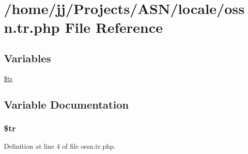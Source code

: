 \hypertarget{locale_2ossn_8tr_8php}{}\section{/home/jj/\+Projects/\+A\+S\+N/locale/ossn.tr.\+php File Reference}
\label{locale_2ossn_8tr_8php}
\subsection*{Variables}
\begin{DoxyCompactItemize}
\item 
\hyperlink{locale_2ossn_8tr_8php_a925f466a276b200c71b2567d39b4dba7}{\$tr}
\end{DoxyCompactItemize}


\subsection{Variable Documentation}
\subsubsection[{\texorpdfstring{\$tr}{$tr}}]{\setlength{\rightskip}{0pt plus 5cm}\$tr}\hypertarget{locale_2ossn_8tr_8php_a925f466a276b200c71b2567d39b4dba7}{}\label{locale_2ossn_8tr_8php_a925f466a276b200c71b2567d39b4dba7}


Definition at line 4 of file ossn.\+tr.\+php.

